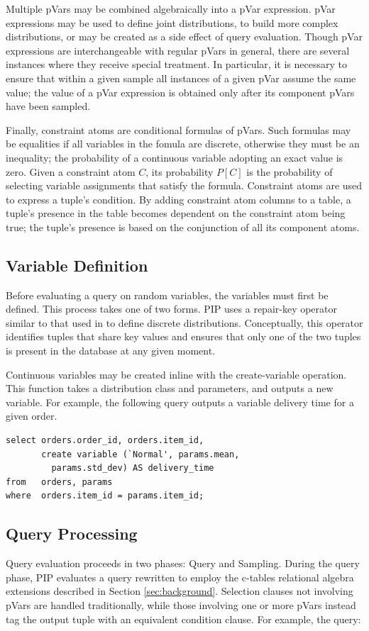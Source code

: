 Multiple pVars may be combined algebraically into a pVar expression.  pVar expressions may be used to define joint distributions, to build more complex distributions, or may be created as a side effect of query evaluation.  Though pVar expressions are interchangeable with regular pVars in general, there are several instances where they receive special treatment.  In particular, it is necessary to ensure that within a given sample all instances of a given pVar assume the same value; the value of a pVar expression is obtained only after its component pVars have been sampled.

Finally, constraint atoms are conditional formulas of pVars.  Such formulas may be equalities if all variables in the fomula are discrete, otherwise they must be an inequality; the probability of a continuous variable adopting an exact value is zero.  Given a constraint atom $C$, its probability $P[C]$ is the probability of selecting variable assignments that satisfy the formula.  Constraint atoms are used to express a tuple's condition.  By adding constraint atom columns to a table, a tuple's presence in the table becomes dependent on the constraint atom being true; the tuple's presence is based on the conjunction of all its component atoms.

\subsection{Variable Definition}
Before evaluating a query on random variables, the variables must first be defined.  This process takes one of two forms.  PIP uses a repair-key operator similar to that used in \cite{KochMayBMS2008} to define discrete distributions.  Conceptually, this operator identifies tuples that share key values and ensures that only one of the two tuples is present in the database at any given moment.  

Continuous variables may be created inline with the create-variable operation.  This function takes a distribution class and parameters, and outputs a new variable.  For example, the following query outputs a variable delivery time for a given order.

\begin{verbatim}
select orders.order_id, orders.item_id,
       create variable (`Normal', params.mean,
         params.std_dev) AS delivery_time
from   orders, params
where  orders.item_id = params.item_id;
\end{verbatim}

\subsection{Query Processing}
Query evaluation proceeds in two phases: Query and Sampling.  During the query phase, PIP evaluates a query rewritten to employ the c-tables relational algebra extensions described in Section \ref{sec:background}.  Selection clauses not involving pVars are handled traditionally, while those involving one or more pVars instead tag the output tuple with an equivalent condition clause.  For example, the query:

